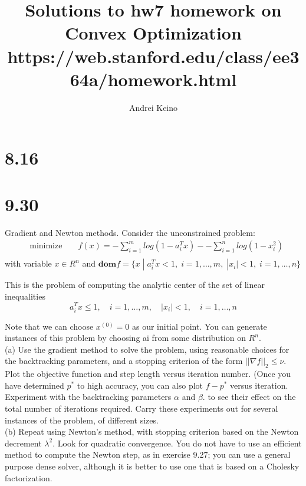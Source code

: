 \documentclass{article}
\begin{document}
\title{Solutions to hw7 homework on Convex Optimization https://web.stanford.edu/class/ee364a/homework.html}
\author{Andrei Keino}
\maketitle


\section*{8.16}

\section*{9.30}
Gradient and Newton methods. Consider the unconstrained problem: \\
\begin{align*}
	&\text{minimize } && 
	f(x) = - \sum_{i=1}^m log(1 - a_i^T x) - 
	- \sum_{i=1}^n log(1 - x_i^2) \\
\end{align*}
with variable $x \in R^n$ and 
$\mathbf{dom} f =\{ x\; | \; a_i^T x < 1, \; 
i = 1, \dots, m, \; |x_i| < 1, \; i = 1, \dots, n \}$

This is the problem of computing the analytic center of the set of linear inequalities
$$
a_i^T x \leq 1, \quad i = 1, \dots, m, \quad |x_i| < 1, \quad i = 1, \dots, n
$$

Note that we can choose $x^{(0)} = 0$ as our initial point. You can generate instances of this
problem by choosing ai from some distribution on $R^n.$ \\

(a) Use the gradient method to solve the problem, using reasonable choices for the backtracking
parameters, and a stopping criterion of the form 
$||\nabla f||_2 \leq \nu.$ Plot the
objective function and step length versus iteration number. (Once you have determined $p^*$ to high accuracy, you can also plot $f - p^*$ versus iteration. Experiment
with the backtracking parameters $\alpha$ and $\beta.$ to see their effect on the total number of
iterations required. Carry these experiments out for several instances of the problem,
of different sizes. \\


(b) Repeat using Newton’s method, with stopping criterion based on the Newton decrement $\lambda ^ 2.$ Look for quadratic convergence. You do not have to use an efficient method
to compute the Newton step, as in exercise 9.27; you can use a general purpose dense
solver, although it is better to use one that is based on a Cholesky factorization.\\
\end{document}
